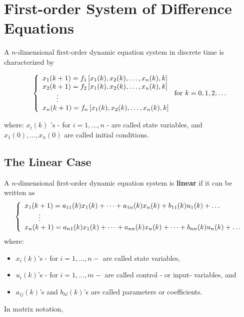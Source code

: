 \section{First-order System of Difference Equations}

\begin{definition}
    A \(n\)-dimensional first-order dynamic equation system in discrete time is characterized by

    \[
        \left\{ \begin{array}{l l}{x_{1}(k + 1) = f_{1}\left[x_{1}(k),x_{2}(k),\dots,x_{n}(k),k\right]}\\ {x_{2}(k + 1) = f_{2}\left[x_{1}(k),x_{2}(k),\dots,x_{n}(k),k\right]}\\ {\qquad \vdots}\\ {x_{n}(k + 1) = f_{n}\left[x_{1}(k),x_{2}(k),\dots,x_{n}(k),k\right]} \end{array} \right.\text{for } k = 0,1,2,\dots
    \]

    where: \(x_{i}(k)\) 's - for \(i = 1, \ldots , n\) - are called state variables, and \(x_{1}(0), \ldots , x_{n}(0)\) are called initial conditions.
\end{definition}

\subsection{The Linear Case}

A $n$-dimensional first-order dynamic equation system is \textbf{linear} if it can be written as \[
    \left\{ \begin{array}{l l}{x_{1}(k + 1) = a_{11}(k)x_{1}(k) + \dots +a_{1n}(k)x_{n}(k) + b_{11}(k)u_{1}(k) + \dots}\\ {\qquad \vdots}\\ {x_{n}(k + 1) = a_{n1}(k)x_{1}(k) + \dots +a_{n n}(k)x_{n}(k) + \dots +b_{n n}(k)u_{n}(k) + \dots} \end{array} \right.
\]
where: \begin{itemize}
    \item \(x_{i}(k)\)'s - for \(i = 1, \ldots , n-\) are called state variables,
    \item \(u_{i}(k)\)'s - for \(i = 1, \ldots , m-\) are called control - or input- variables, and
    \item \(a_{ij}(k)\)'s and \(b_{hl}(k)\)'s are called parameters or coefficients.
\end{itemize}

In matrix notation,

